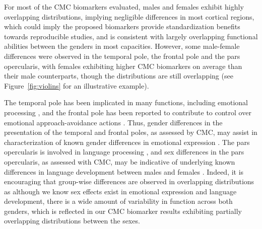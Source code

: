 \documentclass{article}
\begin{document}
For most of the CMC biomarkers evaluated, males and females exhibit highly
overlapping distributions, implying negligible differences in most cortical
regions, which could imply the proposed biomarkers provide standardization
benefits towards reproducible studies, and is consistent with largely
overlapping functional abilities between the genders in most capacities.
However, some male-female differences were observed in the temporal pole, the
frontal pole and the pars opercularis, with females exhibiting higher CMC
biomarkers on average than their male counterparts, though the distributions
are still overlapping (see Figure~\ref{fig:violins} for an illustrative
example).

The temporal pole has been implicated in many functions, including
emotional processing \citep{corcoles-paradaFrontalInsularInput2019}, and the
frontal pole has been reported to contribute to control over emotional
approach-avoidance actions \citep{bramsonHumanLateralFrontal2020}. Thus,
gender differences in the presentation of the temporal and frontal poles, as
assessed by CMC, may assist in characterization of known gender differences
in emotional expression \citep{chaplinGenderEmotionExpression2015}. The pars
opercularis is involved in language processing
\citep{greweEmergenceUnmarkedNew2005}, and sex differences in the pars
opercularis, as assessed with CMC, may be indicative of underlying known
differences in language development between males and females
\citep{satoNeurobiologySexDifferences2020}. Indeed, it is encouraging that
group-wise differences are observed in overlapping distributions as although
we know sex effects exist in emotional expression and language development,
there is a wide amount of variability in function across both genders, which
is reflected in our CMC biomarker results exhibiting partially overlapping
distributions between the sexes.


%
%
%
%
\end{document}
